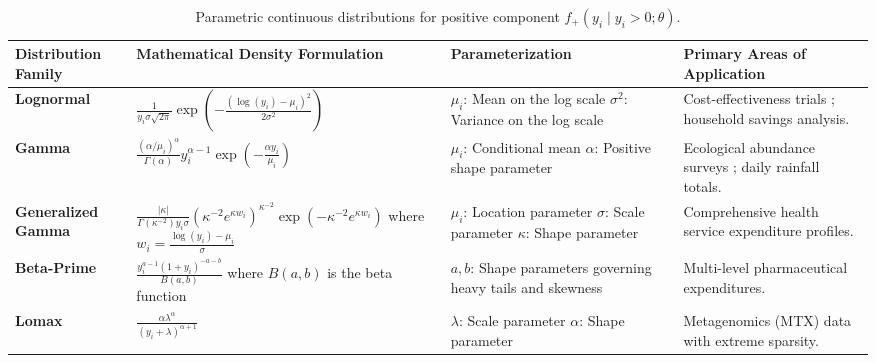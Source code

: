 \documentclass[11pt, a4paper]{article}
\begin{document}
\begin{table}[htbp]
\centering
\small
\caption{Parametric continuous distributions for positive component $f_+(y_i \mid y_i > 0; \theta)$.}
\label{tab:distributions}
\begin{tabularx}{\textwidth}{l X p{3.8cm} X}
\toprule
\textbf{Distribution Family} & \textbf{Mathematical Density Formulation} & \textbf{Parameterization} & \textbf{Primary Areas of Application} \\
\midrule
\textbf{Lognormal} \cite{ref4, ref15, ref18} & $\frac{1}{y_i \sigma \sqrt{2\pi}} \exp\left( -\frac{(\log(y_i) - \mu_i)^2}{2\sigma^2} \right)$ \cite{ref18} & $\mu_i$: Mean on the log scale \cite{ref1, ref15} \newline $\sigma^2$: Variance on the log scale \cite{ref15, ref18} & Cost-effectiveness trials \cite{ref19, ref20}; household savings analysis. \cite{ref8} \\
\addlinespace
\textbf{Gamma} \cite{ref4, ref17, ref18} & $\frac{(\alpha / \mu_i)^\alpha}{\Gamma(\alpha)} y_i^{\alpha-1} \exp\left( -\frac{\alpha y_i}{\mu_i} \right)$ \cite{ref18} & $\mu_i$: Conditional mean \cite{ref17, ref18} \newline $\alpha$: Positive shape parameter \cite{ref18, ref21} & Ecological abundance surveys \cite{ref4, ref22}; daily rainfall totals. \cite{ref2} \\
\addlinespace
\textbf{Generalized Gamma} \cite{ref3, ref6} & $\frac{|\kappa|}{\Gamma(\kappa^{-2}) y_i \sigma} \left( \kappa^{-2} e^{\kappa w_i} \right)^{\kappa^{-2}} \exp\left( -\kappa^{-2} e^{\kappa w_i} \right)$ \newline where $w_i = \frac{\log(y_i) - \mu_i}{\sigma}$ \cite{ref6} & $\mu_i$: Location parameter \newline $\sigma$: Scale parameter \newline $\kappa$: Shape parameter \cite{ref6} & Comprehensive health service expenditure profiles. \cite{ref3, ref6, ref23} \\
\addlinespace
\textbf{Beta-Prime} \cite{ref7} & $\frac{y_i^{a-1} (1 + y_i)^{-a-b}}{B(a, b)}$ \newline where $B(a, b)$ is the beta function \cite{ref7} & $a, b$: Shape parameters governing heavy tails and skewness \cite{ref7} & Multi-level pharmaceutical expenditures. \cite{ref7} \\
\addlinespace
\textbf{Lomax} \cite{ref24} & $\frac{\alpha \lambda^\alpha}{(y_i + \lambda)^{\alpha+1}}$ \cite{ref24} & $\lambda$: Scale parameter \newline $\alpha$: Shape parameter \cite{ref24} & Metagenomics (MTX) data with extreme sparsity. \cite{ref24} \\
\bottomrule
\end{tabularx}
\end{table}
\end{document}
